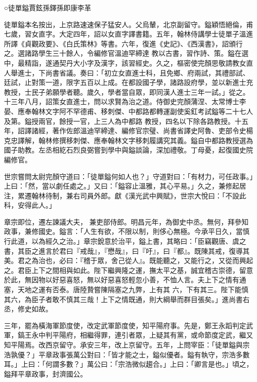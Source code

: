 
\begin{pinyinscope}

 ○徒單鎰賈鉉孫鐸孫即康李革



 徒單鎰本名按出，上京路速速保子猛安人。父烏輦，北京副留守。鎰穎悟絕倫，甫七歲，習女直字。大定四年，詔以女直字譯書籍。五年，翰林侍講學士徒單子溫進所譯《貞觀政要》、《白氏策林》等書。六年，復進《史記》、《西漢書》，詔頒行之。選諸路學生三十餘人，令編修官溫迪罕締達
 教以古書，習作詩、策。鎰在選中，最精詣，遂通契丹大小字及漢字，該習經史。久之，樞密使完顏思敬請教女直人舉進士，下尚書省議。奏曰：「初立女直進士科，且免鄉、府兩試，其禮部試、廷試，止對策一道，限字五百以上成。在都設國子學，諸路設府學，並以新進士充教授，士民子弟願學者聽。歲久，學者當自眾，即同漢人進士三年一試。」從之。十三年八月，詔策女直進士，問以求賢為治之道。侍御史完顏蒲涅、太常博士李晏、應奉翰林文字阿不罕德甫、移刺傑、中都路都轉運副使奚釭考試鎰等二十七人及第。鎰授兩官，餘授一官，上三人為中都路
 教授，四名以下除各路教授。十五年，詔譯諸經，著作佐郎溫迪罕締達、編修官宗璧、尚書省譯史阿魯、吏部令史楊克忠譯解，翰林修撰移刺傑、應奉翰林文字移刺履講究其義。鎰自中都路教授選為國子助教。左丞相紇石烈良弼嘗到學中與鎰談論，深加禮敬。丁母憂，起復國史院編修官。



 世宗嘗問太尉完顏守道曰：「徒單鎰何如人也？」守道對曰：「有材力，可任政事。」上曰：「然，當以劇任處之。」又曰：「鎰容止溫雅，其心平易。」久之，兼修起居注，累遷翰林待制，兼右司員外郎。獻《漢光武中興賦》，世宗大悅曰：「不設此科，安得此人。」



 章宗即位，遷左諫議大夫，
 兼吏部侍郎。明昌元年，為御史中丞。無何，拜參知政事，兼修國史。鎰言：「人生有欲，不限以制，則侈心無極。今承平日久，當慎行此道，以為經久之治。」章宗銳意於治平，鎰上書，其略曰：「臣竊觀唐、虞之書，其臣之進言於君曰『戒哉』，『懋哉』，曰『吁』，曰『都』。既陳其戒，復導其美。君之為治也，必曰：『稽于眾，舍己從人』。既能聽之，又能行之，又從而興起之。君臣上下之間相與如此。陛下繼興隆之運，撫太平之基，誠宜稽古崇德，留意於此，無因物以好惡喜怒，無以好惡喜怒輕忽小善，不恤人言。夫上下之情有通塞，天地之運有否泰。唐陸贄嘗陳隔塞之九弊，上有其
 六，下有其三。陛下能慎其六，為臣子者敢不慎其三哉！上下之情既通，則大綱舉而群目張矣。」進尚書右丞，修史如故。



 三年，罷為橫海軍節度使，改定武軍節度使，知平陽府事。先是，鄭王永蹈判定武軍，鎬王永中判平陽府，相繼得罪，連引者眾，上疑其有黨，或命節度定武，繼又知平陽焉。改西京留守。承安三年，改上京留守。五年，上問宰臣：「徒單鎰與宗浩孰優？」平章政事張萬公對曰：「皆才能之士，鎰似優者。鎰有執守，宗浩多數耳。」上曰：「何謂多數？」萬公曰：「宗浩微似趨合。」上曰：「卿言是也。」頃之，鎰拜平章政事，封濟國公。




\end{pinyinscope}
